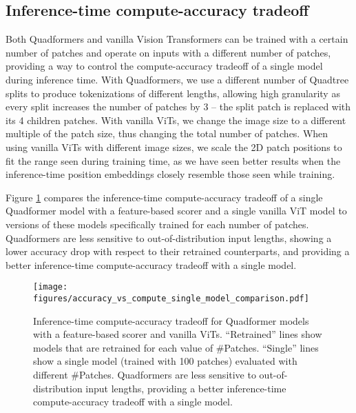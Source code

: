 \subsection{Inference-time compute-accuracy tradeoff}
Both Quadformers and vanilla Vision Transformers can be trained with a certain number of patches and operate on inputs with a different number of patches, providing a way to control the compute-accuracy tradeoff of a single model during inference time. With Quadformers, we use a different number of Quadtree splits to produce tokenizations of different lengths, allowing high granularity as every split increases the number of patches by 3 -- the split patch is replaced with its 4 children patches. With vanilla ViTs, we change the image size to a different multiple of the patch size, thus changing the total number of patches. When using vanilla ViTs with different image sizes, we scale the 2D patch positions to fit the range seen during training time, as we have seen better results when the inference-time position embeddings closely resemble those seen while training.

Figure \ref{figure:accuracy_vs_compute_single_model_comparison} compares the inference-time compute-accuracy tradeoff of a single Quadformer model with a feature-based scorer and a single vanilla ViT model to versions of these models specifically trained for each number of patches. Quadformers are less sensitive to out-of-distribution input lengths, showing a lower accuracy drop with respect to their retrained counterparts, and providing a better inference-time compute-accuracy tradeoff with a single model.

\begin{figure}[t!]
  \centering
  \vspace*{-4pt}
  \hspace*{-0.02\linewidth}
  \texttt{[image: figures/accuracy\_vs\_compute\_single\_model\_comparison.pdf]}
  \caption{Inference-time compute-accuracy tradeoff for Quadformer models with a feature-based scorer and vanilla ViTs. ``Retrained'' lines show models that are retrained for each value of \#Patches. ``Single'' lines show a single model (trained with 100 patches) evaluated with different \#Patches. Quadformers are less sensitive to out-of-distribution input lengths, providing a better inference-time compute-accuracy tradeoff with a single model.}
  \label{figure:accuracy_vs_compute_single_model_comparison}
\end{figure}




